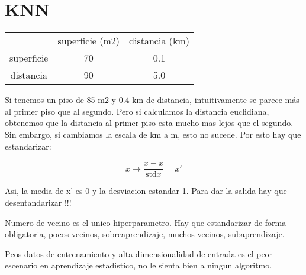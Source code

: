 \chapter{KNN}\label{Chapter7} 


\begin{table}
\centering
\begin{tabular}{ccc}
 & superficie (m2) & distancia (km) \\
superficie & 70 & 0.1 \\
distancia & 90 & 5.0
\end{tabular}
\end{table}

Si tenemos un piso de 85 m2 y 0.4 km de distancia, intuitivamente se parece más al primer piso que al segundo. Pero si calculamos la distancia euclidiana, obtenemos que la distancia al primer piso esta mucho mas lejos que el segundo. Sin embargo, si cambiamos la escala de km a m, esto no sucede. Por esto hay que estandarizar:

\begin{equation}
x \to \frac{x - \bar{x}}{\text{std}x} = x'
\end{equation}

Asi, la media de x' es 0 y la desviacion estandar 1. Para dar la salida hay que desentandarizar !!!

Numero de vecino es el unico hiperparametro. Hay que estandarizar de forma obligatoria, pocos vecinos, sobreaprendizaje, muchos vecinos, subaprendizaje.

Pcos datos de entrenamiento y alta dimensionalidad de entrada es el peor escenario en aprendizaje estadistico, no le sienta bien a ningun algoritmo.